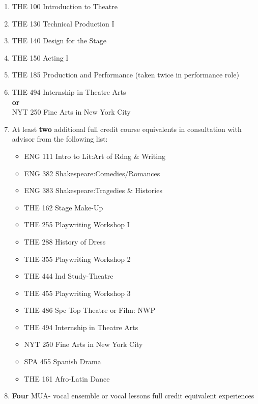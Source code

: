 \documentclass[
  letterpaper,
]{scrbook}
\providecommand{\tightlist}{%
  \setlength{\itemsep}{0pt}\setlength{\parskip}{0pt}}
\begin{document}
\begin{enumerate}
\def\labelenumi{\arabic{enumi}.}
\tightlist
\item
  THE 100 Introduction to Theatre\\
\item
  THE 130 Technical Production I\\
\item
  THE 140 Design for the Stage\\
\item
  THE 150 Acting I\\
\item
  THE 185 Production and Performance (taken twice in performance role)\\
\item
  THE 494 Internship in Theatre Arts\\
  \textbf{or}\\
  NYT 250 Fine Arts in New York City\\
\item
  At least \textbf{two} additional full credit course equivalents in
  consultation with advisor from the following list:

  \begin{itemize}
  \tightlist
  \item
    ENG 111 Intro to Lit:Art of Rdng \& Writing\\
  \item
    ENG 382 Shakespeare:Comedies/Romances\\
  \item
    ENG 383 Shakespeare:Tragedies \& Histories\\
  \item
    THE 162 Stage Make-Up\\
  \item
    THE 255 Playwriting Workshop I\\
  \item
    THE 288 History of Dress\\
  \item
    THE 355 Playwriting Workshop 2\\
  \item
    THE 444 Ind Study-Theatre\\
  \item
    THE 455 Playwriting Workshop 3\\
  \item
    THE 486 Spc Top Theatre or Film: NWP\\
  \item
    THE 494 Internship in Theatre Arts\\
  \item
    NYT 250 Fine Arts in New York City\\
  \item
    SPA 455 Spanish Drama\\
  \item
    THE 161 Afro-Latin Dance\\
  \end{itemize}
\item
  \textbf{Four} MUA- vocal ensemble or vocal lessons full credit
  equivalent experiences
\end{enumerate}
\end{document}
